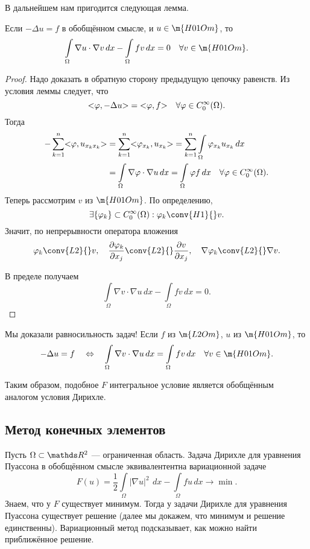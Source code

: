 В дальнейшем нам пригодится следующая лемма.
\begin{lemma}
Если $-\Delta u = f$ в обобщённом смысле, и $u \in \m{H01Om}$, то
$$ \int \limits_\Omega \nabla u \cdot \nabla v \, dx - \int \limits_\Omega fv \, dx = 0 \quad \forall v \in \m{H01Om}.$$
\end{lemma}
\begin{proof} Надо доказать в обратную сторону предыдущую цепочку равенств. Из условия леммы следует, что 
$$ \action{\varphi, -\Delta u} = \action{\varphi, f} \quad \forall \varphi \in C_0^\infty(\Omega).$$
Тогда 
\begin{align*}
- \sum_{k=1}^n \action{\varphi, u_{x_k x_k}} &= \sum_{k=1}^n \action{\varphi_{x_k}, u_{x_k}} = \sum_{k=1}^n \int \limits_\Omega \varphi_{x_k} u_{x_k} \, dx \\
&= \int \limits_\Omega \nabla \varphi \cdot \nabla u \, dx = \int \limits_\Omega \varphi f \, dx \quad \forall \varphi \in C_0^\infty(\Omega).
\end{align*}
Теперь рассмотрим $v$ из $\m{H01Om}$. По определению,
$$ \exists \{ \varphi_k \} \subset C_0^\infty(\Omega) : \varphi_k \conv{H1}{} v.$$
Значит, по непрерывности оператора вложения
$$ \varphi_k \conv{L2}{} v, \quad \pder[\varphi_k]{x_j} \conv{L2}{} \pder[v]{x_j}, \quad \nabla \varphi_k \conv{L2}{} \nabla v.$$

В пределе получаем
$$ \int \limits_\Omega \nabla v \cdot \nabla u \, dx - \int \limits_\Omega fv \, dx = 0.$$

\end{proof}

\begin{note} Мы доказали равносильность задач! Если $f$ из $\m{L2Om}$, $u$ из $\m{H01Om}$, то
$$ -\Delta u = f \quad \Leftrightarrow \quad \int \limits_\Omega \nabla v \cdot \nabla u \, dx = \int \limits_\Omega fv \, dx \quad \forall v \in \m{H01Om}.$$
\end{note}

Таким образом, подобное $F$ интегральное условие является обобщённым аналогом условия Дирихле.


\subsection{Метод конечных элементов} Пусть $\Omega \subset \real^2$ --- ограниченная область. Задача Дирихле для уравнения Пуассона в обобщённом смысле эквивалентентна вариационной задаче
$$ F(u) = \frac {1}{2} \int \limits_\Omega |\nabla u|^2\ \,dx - \int \limits_\Omega fu \, dx \rightarrow \min.$$
Знаем, что у $F$ существует минимум. Тогда у задачи Дирихле для уравнения Пуассона существует решение (далее мы докажем, что минимум и решение единственны). Вариационный метод подсказывает, как можно найти приближённое решение.

